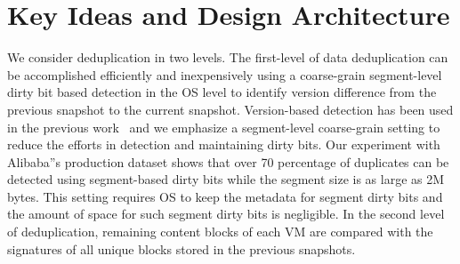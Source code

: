 \section{ Key Ideas and Design Architecture}
\label{sect:arch}




We consider deduplication in two levels. The first-level of data deduplication can be accomplished efficiently and 
inexpensively using a coarse-grain segment-level  dirty bit based detection in the OS level  to 
identify version difference from the previous snapshot to the current snapshot.  
Version-based detection has been used in the previous work~\cite{Clements2009,Vrable2009,TanIPDPS2011} and
we emphasize a segment-level coarse-grain setting to reduce the efforts in detection and maintaining dirty bits. 
Our experiment with Alibaba''s production dataset shows that over 70 percentage of 
duplicates can be detected using segment-based dirty bits while the segment size is as large as 2M bytes.  
This setting requires OS to keep the metadata for segment dirty bits and the amount of space for such segment 
dirty bits is negligible. In the second level of deduplication, remaining content blocks of each VM 
are compared with the signatures of all unique  blocks stored in the previous snapshots.

